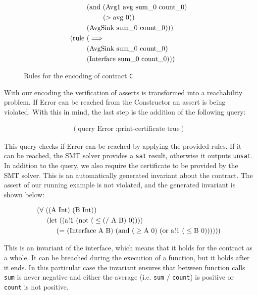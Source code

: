 \begin{figure}[p]
\begin{align*}
    & (\text{and } (\text{Avg1 avg sum\_0 count\_0}) \\
    & \hspace{0.83cm} (>\text{avg 0})) \\ 
    & (\text{AvgSink sum\_0 count\_0})))
    \\
    (\text{rule } & (\implies \\
    & (\text{AvgSink sum\_0 count\_0}) \\ 
    & (\text{Interface sum\_0 count\_0})))
    \end{align*}
	\caption{Rules for the encoding of contract \texttt{C}}
	\label{fig:chc_rules}
\end{figure}

With our encoding the verification of asserts is transformed into a reachability problem. If Error can be reached from the Constructor an assert is being violated. With this in mind, the last step is the addition of the following query:

\begin{align*}
(\text{query Error :print-certificate true})
\end{align*}

This query checks if Error can be reached by applying the provided rules. If it can be reached, the SMT solver provides a \texttt{sat} result, otherwise it outputs \texttt{unsat}. In addition to the query, we also require the certificate to be provided by the SMT solver. This is an automatically generated invariant about the contract. The assert of our running example is not violated, and the generated invariant is shown below:

\begin{align*}
& (\forall \text{ ((A Int) } \text{(B Int))} \\
& \hspace{0.5cm} \text{(let } \text{((a!1 (not (} \leq \text{(/ A B) 0))))} \\
& \hspace{1cm} \text{(= (Interface A B) (and (} \geq \text{A 0) (or a!1 (} \leq \text{B 0))}\text{))))}
\end{align*}

This is an invariant of the interface, which means that it holds for the contract as a whole. It can be breached during the execution of a function, but it holds after it ends. In this particular case the invariant ensures that between function calls \texttt{sum} is never negative and either the average (i.e. \texttt{sum} / \texttt{count}) is positive or \texttt{count} is not positive.


